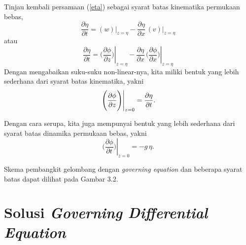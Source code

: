 \documentclass[12pt,a4paper]{report}
\begin{document}
Tinjau kembali persamaan (\ref{eta}) sebagai syarat batas kinematika
permukaan bebas,
\begin{equation}
\frac{\partial \eta}{\partial t}= \left.(w)\right|_{z=\eta}- \frac{\partial
\eta}{\partial x}\,\left.(v)\right|_{z=\eta}
\end{equation}
atau
\begin{equation}
\frac{\partial \eta}{\partial t}= \left.\Bigg(\frac{\partial \phi}{\partial z%
}\Bigg)\right|_{z=\eta} - \frac{\partial \eta}{\partial x}\, \left.\Bigg(%
\frac{\partial \phi}{\partial x}\Bigg)\right|_{z=\eta}
\end{equation}
Dengan mengabaikan suku-suku non-linear-nya, kita miliki bentuk yang lebih
sederhana dari syarat batas kinematika, yakni
\begin{equation}
\left.\Bigg(\frac{\partial \phi}{\partial z} \Bigg)\right|_{z=0}=\frac{%
\partial\eta}{\partial t}.
\end{equation}

Dengan cara serupa, kita juga mempunyai bentuk yang lebih sederhana dari
syarat batas dinamika permukaan bebas, yakni
\begin{equation}
\left. \Bigg(\frac{\partial \phi }{\partial t}\Bigg)\right| _{z=0}=-g\,\eta .
\label{permukaan}
\end{equation}

Skema pembangkit gelombang dengan \textit{governing equation} dan
beberapa syarat batas dapat dilihat pada Gambar 3.2.

\section{Solusi \textit{Governing Differential Equation}}
\end{document}
